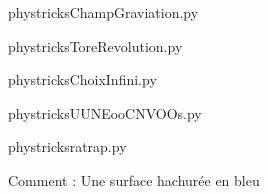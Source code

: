     \clearpage
    


    \newcommand{\CaptionFigChampGraviation}{<+Type your caption here+>}
    \begin{center}
        
    \end{center}
    phystricksChampGraviation.py

    

    \clearpage
    


    \newcommand{\CaptionFigToreRevolution}{<+Type your caption here+>}
    \begin{center}
        
    \end{center}
    phystricksToreRevolution.py

    

    \clearpage
    


    \newcommand{\CaptionFigChoixInfini}{<+Type your caption here+>}
    \begin{center}
        
    \end{center}
    phystricksChoixInfini.py

    

    \clearpage
    


    \newcommand{\CaptionFigUUNEooCNVOOs}{<+Type your caption here+>}
    \begin{center}
        
    \end{center}
    phystricksUUNEooCNVOOs.py

    

    \clearpage
    


    \newcommand{\CaptionFigratrap}{<+Type your caption here+>}
    \begin{center}
        
    \end{center}
    phystricksratrap.py

    Comment : Une surface hachurée en bleu

    \clearpage
    


